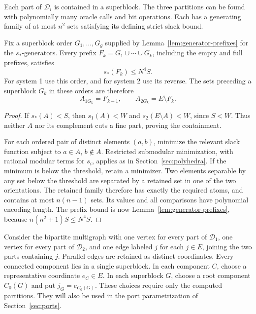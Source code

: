 \begin{lemma}
\label{lem:partitions}
Each part of \(\mathcal D_i\) is contained in a superblock.
The three partitions can be found with polynomially many oracle calls
and bit operations.  Each has a generating family of at most \(n^2\)
sets satisfying its defining strict slack bound.

Fix a superblock order \(G_1,\ldots,G_g\) supplied by
Lemma~\ref{lem:generator-prefixes} for the \(s_*\)-generators.
Every prefix \(F_k=G_1\cup\cdots\cup G_k\), including the empty
and full prefixes, satisfies
\begin{equation}\label{eq:superblock-prefix-slack}
 s_*(F_k)\le N^4S.
\end{equation}
For system 1 use this order, and for system 2 use its reverse.  The
sets preceding a superblock \(G_k\) in these orders are therefore
\begin{equation}\label{eq:superblock-prefixes}
 A_{1G_k}=F_{k-1},\qquad A_{2G_k}=E\setminus F_k.
\end{equation}
\end{lemma}

\begin{proof}
If \(s_*(A)<S\), then \(s_1(A)<W\) and
\(s_2(E\setminus A)<W\), since \(S<W\).  Thus neither \(A\)
nor its complement cuts a fine part, proving the containment.

For each ordered pair of distinct elements \((a,b)\), minimize the
relevant slack function subject to \(a\in A\), \(b\notin A\).
Restricted submodular minimization, with rational modular terms for
\(s_i\), applies as in Section~\ref{sec:polyhedra}.  If the minimum
is below the threshold, retain a minimizer.  Two elements separable
by any set below the threshold are separated by a retained set in
one of the two orientations.  The retained family therefore has
exactly the required atoms, and contains at most \(n(n-1)\) sets.
Its values and all comparisons have polynomial encoding length.
The prefix bound is now Lemma~\ref{lem:generator-prefixes}, because
\(n(n^2+1)S\le N^4S\).
\end{proof}

Consider the bipartite multigraph with one vertex for every part of
\(\mathcal D_1\), one vertex for every part of \(\mathcal D_2\),
and one edge labeled \(j\) for each \(j\in E\), joining the two
parts containing \(j\).  Parallel edges are retained as distinct
coordinates.  Every connected component lies in a single superblock.
In each component \(C\), choose a representative coordinate
\(e_C\in E\).  In each superblock \(G\), choose a root component
\(C_0(G)\) and put \(j_G=e_{C_0(G)}\).  These choices require only
the computed partitions.  They will also be used in the port
parametrization of Section~\ref{sec:ports}.

